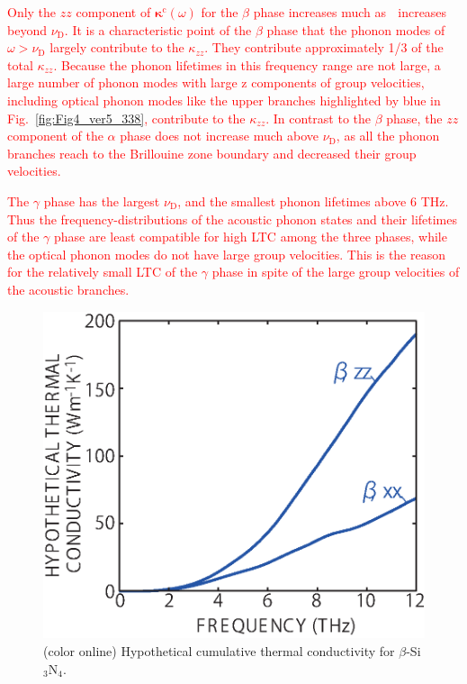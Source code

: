 \documentclass[twocolumn,amsmath,amssymb,a4paper,prb,superscriptaddress,floatfix]{revtex4-1}
\begin{document}
\textcolor{red}{Only the $zz$ component of
$\boldsymbol{\kappa}^\text{c}(\omega)$ for the $\beta$ phase increases
much as  increases beyond $\nu_\text{D}$. It is a characteristic point
of the $\beta$ phase that the phonon modes of $\omega > \nu_\text{D}$
largely contribute to the $\kappa_{zz}$. They contribute approximately
1/3 of the total $\kappa_{zz}$. Because the phonon lifetimes in this
frequency range are not large, a large number of phonon modes with large
z components of group velocities, including optical phonon modes like
the upper branches highlighted by blue in Fig.~\ref{fig:Fig4_ver5_338},
contribute to the $\kappa_{zz}$. In contrast to the $\beta$ phase, the
$zz$ component of the $\alpha$ phase does not increase much above
$\nu_\text{D}$, as all the phonon branches reach to the Brillouine zone
boundary and decreased their group velocities.}

\textcolor{red}{The $\gamma$ phase has the largest $\nu_\text{D}$, and
the smallest phonon lifetimes above 6 THz. Thus the
frequency-distributions of the acoustic phonon states and their
lifetimes of the $\gamma$ phase are least compatible for high LTC among
the three phases, while the optical phonon modes do not have large group
velocities. This is the reason for the relatively small LTC of the
$\gamma$ phase in spite of the large group velocities of the acoustic
branches.}

\begin{figure}[ht]
 \begin{center}
  \includegraphics[width=0.80\linewidth]{Fig6_338_beta.eps}
  \caption{(color online) Hypothetical cumulative thermal conductivity
  for $\beta$-Si$_3$N$_4$. \label{fig:Fig6_338_beta} }
 \end{center}
\end{figure}
\end{document}
